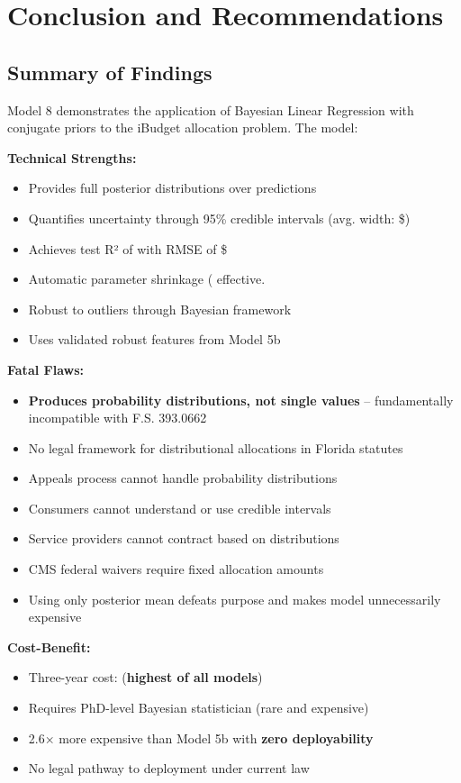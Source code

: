 \section{Conclusion and Recommendations}

\subsection{Summary of Findings}

Model 8 demonstrates the application of Bayesian Linear Regression with conjugate priors to the iBudget allocation problem. The model:

\textbf{Technical Strengths:}
\begin{itemize}
    \item Provides full posterior distributions over predictions
    \item Quantifies uncertainty through 95\% credible intervals (avg. width: \$\ModelEightAvgCredibleWidth{})
    \item Achieves test R² of \ModelEightRSquaredTest{} with RMSE of \$\ModelEightRMSETest{}
    \item Automatic parameter shrinkage (\ModelEightEffectiveParams{} effective. %
    \item Robust to outliers through Bayesian framework
    \item Uses validated robust features from Model 5b
\end{itemize}

\textbf{Fatal Flaws:}
\begin{itemize}
    \item \textbf{Produces probability distributions, not single values} -- fundamentally incompatible with F.S. 393.0662
    \item No legal framework for distributional allocations in Florida statutes
    \item Appeals process cannot handle probability distributions
    \item Consumers cannot understand or use credible intervals
    \item Service providers cannot contract based on distributions
    \item CMS federal waivers require fixed allocation amounts
    \item Using only posterior mean defeats purpose and makes model unnecessarily expensive
\end{itemize}

\textbf{Cost-Benefit:}
\begin{itemize}
    \item Three-year cost: \ModelEightThreeYearTCO{} (\textbf{highest of all models})
    \item Requires PhD-level Bayesian statistician (rare and expensive)
    \item 2.6× more expensive than Model 5b with \textbf{zero deployability}
    \item No legal pathway to deployment under current law
\end{itemize}

